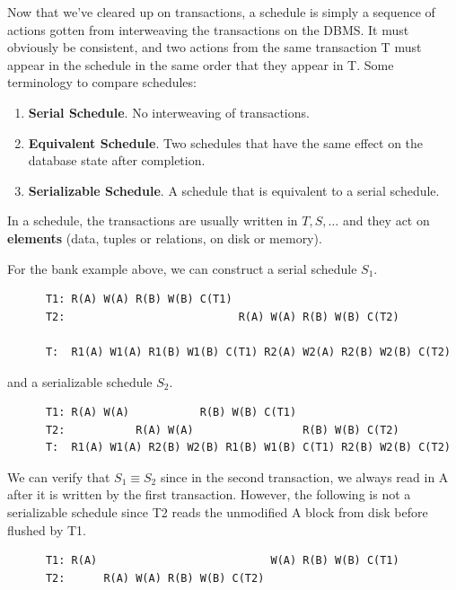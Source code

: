   \begin{definition}[Schedule]
    Now that we've cleared up on transactions, a schedule is simply a sequence of actions gotten from interweaving the transactions on the DBMS. It must obviously be consistent, and two actions from the same transaction T must appear in the schedule in the same order that they appear in T. Some terminology to compare schedules: 
    \begin{enumerate}
      \item \textbf{Serial Schedule}. No interweaving of transactions. 
      \item \textbf{Equivalent Schedule}. Two schedules that have the same effect on the database state after completion. 
      \item \textbf{Serializable Schedule}. A schedule that is equivalent to a serial schedule. 
    \end{enumerate}
    In a schedule, the transactions are usually written in $T, S, \ldots$ and they act on \textbf{elements} (data, tuples or relations, on disk or memory). 
  \end{definition}

  \begin{example}
    For the bank example above, we can construct a serial schedule $S_1$. 
    \begin{lstlisting}
      T1: R(A) W(A) R(B) W(B) C(T1)
      T2:                           R(A) W(A) R(B) W(B) C(T2)

      T:  R1(A) W1(A) R1(B) W1(B) C(T1) R2(A) W2(A) R2(B) W2(B) C(T2)
    \end{lstlisting}
    and a serializable schedule $S_2$. 
    \begin{lstlisting}
      T1: R(A) W(A)           R(B) W(B) C(T1) 
      T2:           R(A) W(A)                 R(B) W(B) C(T2)
      T:  R1(A) W1(A) R2(B) W2(B) R1(B) W1(B) C(T1) R2(B) W2(B) C(T2)
    \end{lstlisting}
    We can verify that $S_1 \equiv S_2$ since in the second transaction, we always read in A after it is written by the first transaction. However, the following is not a serializable schedule since T2 reads the unmodified A block from disk before flushed by T1.  
    \begin{lstlisting}
      T1: R(A)                           W(A) R(B) W(B) C(T1)
      T2:      R(A) W(A) R(B) W(B) C(T2)
    \end{lstlisting}
  \end{example} 

